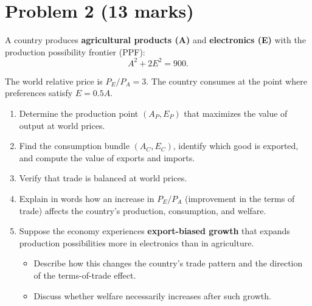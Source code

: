 \documentclass[12pt]{article}
\begin{document}
\section*{Problem 2 (13 marks)}

A country produces \textbf{agricultural products (A)} and \textbf{electronics (E)} with the production possibility frontier (PPF):
\[
A^2 + 2E^2 = 900.
\]

The world relative price is \( P_E / P_A = 3 \).  
The country consumes at the point where preferences satisfy \( E = 0.5A \).

\begin{enumerate}[label=(\arabic*)]
\item Determine the production point $(A_P, E_P)$ that maximizes the value of output at world prices.  
\item Find the consumption bundle $(A_C, E_C)$, identify which good is exported, and compute the value of exports and imports.  
\item Verify that trade is balanced at world prices.  
\item Explain in words how an increase in \( P_E / P_A \) (improvement in the terms of trade) affects the country’s production, consumption, and welfare.  
\item Suppose the economy experiences \textbf{export-biased growth} that expands production possibilities more in electronics than in agriculture.  
\begin{itemize}
    \item Describe how this changes the country’s trade pattern and the direction of the terms-of-trade effect.  
    \item Discuss whether welfare necessarily increases after such growth.
\end{itemize}
\end{enumerate}
\end{document}
